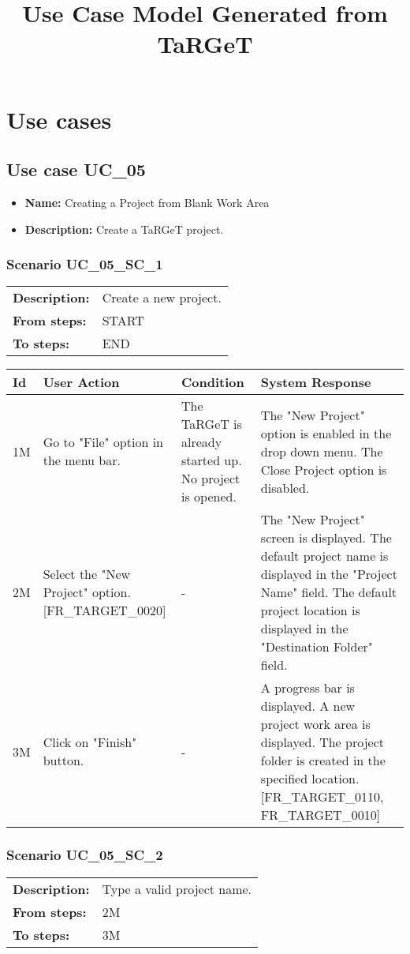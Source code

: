 \documentclass[a4paper,11pt]{article}
\title{Use Case Model Generated from TaRGeT}
\newcommand{\bl}{\\ \hline}
\begin{document}
\maketitle
\section*{Use cases}
\subsection*{Use case UC_05}
\begin{itemize}
\item {\bf Name: }Creating a Project from Blank Work Area
\item {\bf Description: }Create a TaRGeT project.
\end{itemize}
\subsubsection*{Scenario UC_05_SC_1}
\begin{tabular}{p{1in}p{4in}}
{\bf Description:} & Create a new project. \\
{\bf From steps:} & START \\
{\bf To steps:} & END \\
\end{tabular}
 
\begin{tabular}{|p{0.8in}|p{1.6in}|p{1.6in}|p{1.6in}|}
\hline
Id & User Action & Condition & System Response  \bl 
1M & Go to "File" option in the menu bar. & The TaRGeT is already started up. No project is opened. & The "New Project" option is enabled in the drop down menu. The Close Project option is disabled. \bl 
2M & Select the "New Project" option. [FR_TARGET_0020] & - & The "New Project" screen is displayed. The default project name is displayed in the "Project Name" field. The default project location is displayed in the "Destination Folder" field. \bl 
3M & Click on "Finish" button. & - & A progress bar is displayed. A new project work area is displayed. The project folder is created in the specified location. [FR_TARGET_0110, FR_TARGET_0010] \bl 
\end{tabular}
\subsubsection*{Scenario UC_05_SC_2}
\begin{tabular}{p{1in}p{4in}}
{\bf Description:} & Type a valid project name. \\
{\bf From steps:} & 2M \\
{\bf To steps:} & 3M \\
\end{tabular}
 
\end{document}
